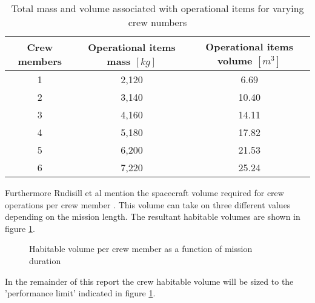 \begin{table}[h!]
	\caption{Total mass and volume associated with operational items for varying crew numbers}
	\begin{tabular}{|c|c|c|}
		\hline
		\textbf{Crew members} & \textbf{Operational items mass $[kg]$} & \textbf{Operational items volume $[m^{3}]$}\\ \hline \hline
		1 & 2,120 & 6.69\\
		2 & 3,140 & 10.40\\
		3 & 4,160 & 14.11\\
		4 & 5,180 & 17.82\\
		5 & 6,200 & 21.53\\
		6 & 7,220 & 25.24\\ \hline
	\end{tabular}
	\label{tab:crewmemberops}
\end{table}
Furthermore Rudisill et al mention the spacecraft volume required for crew operations per crew member \cite{Rudisill2008}. This volume can take on three different values depending on the mission length. The resultant habitable volumes are shown in figure \ref{fig:crewvolume}.
\begin{figure}[h]
	\centering
	\setlength{} 
	\setlength{}
	
	\caption[Habitable volume per crew member as a function of mission duration]{Habitable volume per crew member as a function of mission duration \cite{Rudisill2008}}
	\label{fig:crewvolume}
\end{figure}
In the remainder of this report the crew habitable volume will be sized to the 'performance limit' indicated in figure \ref{fig:crewvolume}.
